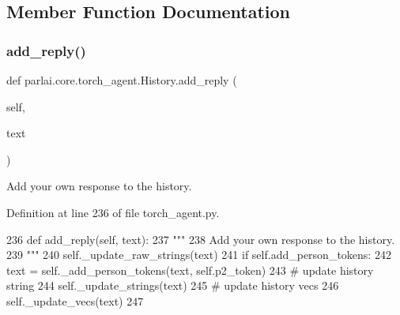 \subsection{Member Function Documentation}
\mbox{\label{classparlai_1_1core_1_1torch__agent_1_1History_a144a39a05745ecd374e9a79c73f5ee66}} 
\subsubsection{\texorpdfstring{add\+\_\+reply()}{add\_reply()}}
{\footnotesize\ttfamily def parlai.\+core.\+torch\+\_\+agent.\+History.\+add\+\_\+reply (\begin{DoxyParamCaption}\item[{}]{self,  }\item[{}]{text }\end{DoxyParamCaption})}

\begin{DoxyVerb}Add your own response to the history.
\end{DoxyVerb}
 

Definition at line 236 of file torch\+\_\+agent.\+py.


\begin{DoxyCode}
236     \textcolor{keyword}{def }add\_reply(self, text):
237         \textcolor{stringliteral}{"""}
238 \textcolor{stringliteral}{        Add your own response to the history.}
239 \textcolor{stringliteral}{        """}
240         self.\_update\_raw\_strings(text)
241         \textcolor{keywordflow}{if} self.add\_person\_tokens:
242             text = self.\_add\_person\_tokens(text, self.p2\_token)
243         \textcolor{comment}{# update history string}
244         self.\_update\_strings(text)
245         \textcolor{comment}{# update history vecs}
246         self.\_update\_vecs(text)
247 
\end{DoxyCode}
\mbox{\label{classparlai_1_1core_1_1torch__agent_1_1History_a29576ee0dd27b8ee5e651297dada3131}} 
